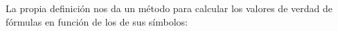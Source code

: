 La propia definición nos da un método para calcular los valores de verdad de fórmulas en función de los de sus símbolos:

